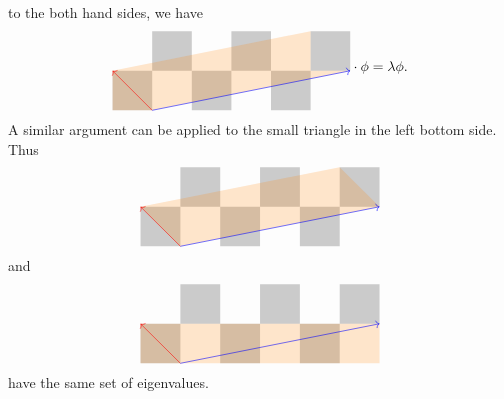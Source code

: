 \documentclass{article}
\begin{document}
to the both hand sides, we have
\[
\diagram{1}{
\foreach \i in {0, 1, 2}
{
    \foreach \j in {0}
    {
        \fill[opacity = .2] (2*\i, 2*\j) rectangle (2*\i+1, 2*\j+1);
        \fill[opacity = .2] (2*\i+1, 2*\j+1) rectangle (2*\i+2, 2*\j+2);
    }
}
\fill[orange, opacity = .2] (0,0) -- (1,0) -- (6,1) -- (5,1) -- (5,2) -- (0,1) -- cycle;
\draw[->, red] (1,0) -- (0,1);
\draw[->, blue] (1,0) -- (6,1);
} \cdot \phi = \lambda \phi.
\]
A similar argument can be applied to the small triangle in the left bottom side. Thus 
\[
\diagram{1}{
\foreach \i in {0, 1, 2}
{
    \foreach \j in {0}
    {
        \fill[opacity = .2] (2*\i, 2*\j) rectangle (2*\i+1, 2*\j+1);
        \fill[opacity = .2] (2*\i+1, 2*\j+1) rectangle (2*\i+2, 2*\j+2);
    }
}
\fill[orange, opacity = .2] (1,0) -- (0,1) -- (5,2) -- (6, 1) -- cycle;
\draw[->, red] (1,0) -- (0,1);
\draw[->, blue] (1,0) -- (6,1);
}
\]
and
\[
\diagram{1}{
\foreach \i in {0, 1, 2}
{
    \foreach \j in {0}
    {
        \fill[opacity = .2] (2*\i, 2*\j) rectangle (2*\i+1, 2*\j+1);
        \fill[opacity = .2] (2*\i+1, 2*\j+1) rectangle (2*\i+2, 2*\j+2);
    }
}
\fill[orange, opacity = .2] (0,0) rectangle (6,1);
\draw[->, red] (1,0) -- (0,1);
\draw[->, blue] (1,0) -- (6,1);
}
\]
have the same set of eigenvalues.


\end{document}
